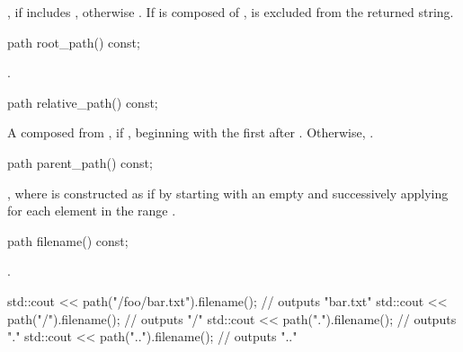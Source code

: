 \begin{itemdescr}
\pnum
\returns {}, if  includes , otherwise .
If  is composed of  ,  is
excluded from the returned string.
\end{itemdescr}

\begin{itemdecl}
path root_path() const;
\end{itemdecl}

\begin{itemdescr}
\pnum
\returns {}.
\end{itemdescr}

\begin{itemdecl}
path relative_path() const;
\end{itemdecl}

\begin{itemdescr}
\pnum
\returns A  composed from , if , beginning
with the first  after . Otherwise, .
\end{itemdescr}

\begin{itemdecl}
path parent_path() const;
\end{itemdecl}

\begin{itemdescr}
\pnum
\returns {},
where  is constructed as if by
  starting with an empty  and successively applying  for each element in the range
  .
\end{itemdescr}

\begin{itemdecl}
path filename() const;
\end{itemdecl}

\begin{itemdescr}
\pnum
\returns {}.

\pnum
\enterexample
\begin{codeblock}
std::cout << path("/foo/bar.txt").filename(); // outputs "bar.txt"
std::cout << path("/").filename();            // outputs "/"
std::cout << path(".").filename();            // outputs "."
std::cout << path("..").filename();           // outputs ".."
\end{codeblock}
\exitexample
\end{itemdescr}

